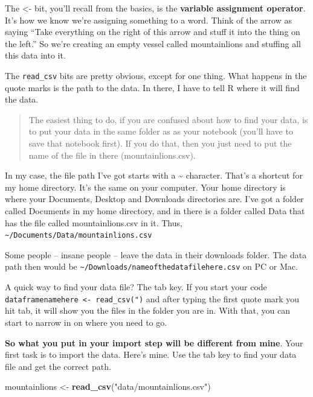 \documentclass[]{book}
\newenvironment{Shaded}{\begin{snugshade}}{\end{snugshade}}
\newcommand{\KeywordTok}[1]{\textcolor[rgb]{0.13,0.29,0.53}{\textbf{#1}}}
\newcommand{\NormalTok}[1]{#1}
\newcommand{\StringTok}[1]{\textcolor[rgb]{0.31,0.60,0.02}{#1}}
\begin{document}
The \textless{}- bit, you'll recall from the basics, is the \textbf{variable assignment operator}. It's how we know we're assigning something to a word. Think of the arrow as saying ``Take everything on the right of this arrow and stuff it into the thing on the left.'' So we're creating an empty vessel called mountainlions and stuffing all this data into it.

The \texttt{read\_csv} bits are pretty obvious, except for one thing. What happens in the quote marks is the path to the data. In there, I have to tell R where it will find the data.

\begin{quote}
The easiest thing to do, if you are confused about how to find your data, is to put your data in the same folder as as your notebook (you'll have to save that notebook first). If you do that, then you just need to put the name of the file in there (mountainlions.csv).
\end{quote}

In my case, the file path I've got starts with a \textasciitilde{} character. That's a shortcut for my home directory. It's the same on your computer. Your home directory is where your Documents, Desktop and Downloads directories are. I've got a folder called Documents in my home directory, and in there is a folder called Data that has the file called mountainlions.csv in it. Thus, \texttt{\textasciitilde{}/Documents/Data/mountainlions.csv}

Some people -- insane people -- leave the data in their downloads folder. The data path then would be \texttt{\textasciitilde{}/Downloads/nameofthedatafilehere.csv} on PC or Mac.

A quick way to find your data file? The tab key. If you start your code \texttt{dataframenamehere\ \textless{}-\ read\_csv(")} and after typing the first quote mark you hit tab, it will show you the files in the folder you are in. With that, you can start to narrow in on where you need to go.

\textbf{So what you put in your import step will be different from mine}. Your first task is to import the data. Here's mine. Use the tab key to find your data file and get the correct path.

\begin{Shaded}
\begin{Highlighting}[]
\NormalTok{mountainlions <-}\StringTok{ }\KeywordTok{read_csv}\NormalTok{(}\StringTok{"data/mountainlions.csv"}\NormalTok{)}
\end{Highlighting}
\end{Shaded}
\end{document}

